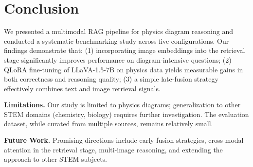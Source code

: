 \documentclass[conference]{IEEEtran}
\begin{document}

\section{Conclusion}
\label{sec:conclusion}

We presented a multimodal RAG pipeline for physics diagram reasoning and conducted a systematic benchmarking study across five configurations.
Our findings demonstrate that:
(1) incorporating image embeddings into the retrieval stage significantly improves performance on diagram-intensive questions;
(2) QLoRA fine-tuning of LLaVA-1.5-7B on physics data yields measurable gains in both correctness and reasoning quality;
(3) a simple late-fusion strategy effectively combines text and image retrieval signals.

\textbf{Limitations.} Our study is limited to physics diagrams; generalization to other STEM domains (chemistry, biology) requires further investigation. The evaluation dataset, while curated from multiple sources, remains relatively small.

\textbf{Future Work.} Promising directions include early fusion strategies, cross-modal attention in the retrieval stage, multi-image reasoning, and extending the approach to other STEM subjects.


\end{document}
